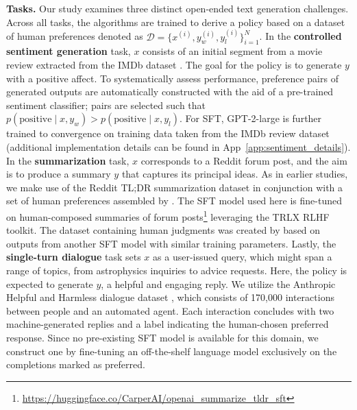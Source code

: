 \textbf{Tasks.} Our study examines three distinct open-ended text generation challenges. Across all tasks, the algorithms are trained to derive a policy based on a dataset of human preferences denoted as $\mathcal{D}=\bigl\{x^{(i)}, y_w^{(i)}, y_l^{(i)}\bigr\}_{i=1}^N$. In the \textbf{controlled sentiment generation} task, $x$ consists of an initial segment from a movie review extracted from the IMDb dataset \cite{maas-EtAl:2011:ACL-HLT2011}. The goal for the policy is to generate $y$ with a positive affect. To systematically assess performance, preference pairs of generated outputs are automatically constructed with the aid of a pre-trained sentiment classifier; pairs are selected such that $p(\text{positive}\mid x,y_w)>p(\text{positive}\mid x,y_l)$. For SFT, GPT-2-large is further trained to convergence on training data taken from the IMDb review dataset (additional implementation details can be found in App~\ref{app:sentiment_details}). In the \textbf{summarization} task, $x$ corresponds to a Reddit forum post, and the aim is to produce a summary $y$ that captures its principal ideas. As in earlier studies, we make use of the Reddit TL;DR summarization dataset \citep{volske-etal-2017-tl} in conjunction with a set of human preferences assembled by \citeauthor{stiennon2022learning}. The SFT model used here is fine-tuned on human-composed summaries of forum posts\footnote{\url{https://huggingface.co/CarperAI/openai_summarize_tldr_sft}} leveraging the TRLX \citep{leandro_von_werra_2023_7790115} RLHF toolkit. The dataset containing human judgments was created by \citeauthor{stiennon2022learning} based on outputs from another SFT model with similar training parameters. Lastly, the \textbf{single-turn dialogue} task sets $x$ as a user-issued query, which might span a range of topics, from astrophysics inquiries to advice requests. Here, the policy is expected to generate $y$, a helpful and engaging reply. We utilize the Anthropic Helpful and Harmless dialogue dataset \citep{bai2022training}, which consists of 170,000 interactions between people and an automated agent. Each interaction concludes with two machine-generated replies and a label indicating the human-chosen preferred response. Since no pre-existing SFT model is available for this domain, we construct one by fine-tuning an off-the-shelf language model exclusively on the completions marked as preferred.

